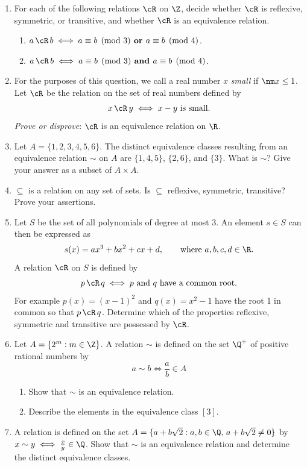 \begin{enumerate}
  \item For each of the following relations $\cR$ on $\Z$, decide whether $\cR$ is reflexive, symmetric, or transitive, and whether $\cR$ is an equivalence relation.
	\begin{enumerate}
		\item $a\,\cR\,b \iff a\equiv b\pmod 3 \textbf{ or } a\equiv b\pmod 4$.
		\item $a\,\cR\,b \iff a\equiv b\pmod 3 \textbf{ and } a\equiv b\pmod 4$.
	\end{enumerate}

	\item For the purposes of this question, we call a real number $x$ \emph{small} if $\nm x\le 1$. Let $\cR$ be the relation on the set of real numbers defined by
	\[x\,\cR\,y \iff x-y \text{ is small}.\]
	\emph{Prove or disprove}: $\cR$ is an equivalence relation on $\R$.

	\item Let $A=\{1,2,3,4,5,6\}$. The distinct equivalence classes resulting from an equivalence relation $\sim$ on $A$ are $\{1,4,5\}$, $\{2,6\}$, and $\{3\}$. What is $\sim$? Give your answer as a subset of $A\times A$.

	\item $\subseteq$ is a relation on any set of sets. Is $\subseteq$ reflexive, symmetric, transitive? Prove your assertions.

	\item Let $S$ be the set of all polynomials of degree at most 3. An element $s\in S$ can then be expressed as
  \[s(x)=ax^3+bx^2+cx+d,\qquad\text{where $a,b,c,d\in\R$.}\]
  A relation $\cR$ on $S$ is defined by
  \[p\,\cR\,q\iff p\text{ and $q$ have a common root.}\]
  For example $p(x)=(x-1)^2$ and $q(x)=x^2-1$ have the root 1 in common so that $p\,\cR\,q$. Determine which of the properties reflexive, symmetric and transitive are possessed by $\cR$.

  \item Let $A=\{2^m:m\in\Z\}$. A relation $\sim$ is defined on the set $\Q^+$ of positive rational numbers by
  \[a\sim b\iff \frac ab\in A\]
  \begin{enumerate}
    \item Show that $\sim$ is an equivalence relation.
    \item Describe the elements in the equivalence class $[3]$.
  \end{enumerate}

  \item A relation is defined on the set $A=\{a+b\sqrt 2:a,b\in\Q,\,a+b\sqrt 2\neq 0\}$ by $x\sim y\iff \frac xy\in\Q$. Show that $\sim$ is an equivalence relation and determine the distinct equivalence classes.
  

\end{enumerate}
